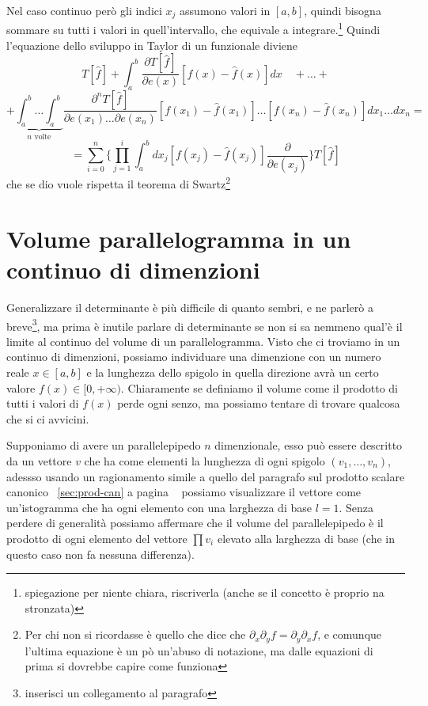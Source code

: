 \documentclass[11pt,a4paper]{report}
\theoremstyle{definition}
\theoremstyle{plain}
\theoremstyle{plain}
\begin{document}
			Nel caso continuo però gli indici $x_j$ assumono valori in $[a,b]$, quindi bisogna sommare su tutti i valori in quell'intervallo, che equivale a integrare.\footnote{spiegazione per niente chiara, riscriverla (anche se il concetto è proprio na stronzata)}\newline
			Quindi l'equazione dello sviluppo in Taylor di un funzionale diviene
			\begin{equation}
				T[\hat f]+\int_a^b \frac{\partial T[\hat f]}{\partial e(x)}[f(x)-\hat f(x)]dx\quad+\dots+
			\end{equation}
			\[
				+\underbrace{\int_a^b\dots\int_a^b}_{n\textrm{ volte}}
				\frac{\partial^n T[\hat f]}{\partial e(x_1)\dots\partial e(x_n)}[f(x_1)-\hat f(x_1)]\dots[f(x_n)-\hat f(x_n)]dx_1\dots dx_n=
			\]
			\begin{equation}
				=\sum_{i=0}^n \Bigg\{\prod_{j=1}^i \int_a^b dx_j[f(x_j)-\hat f(x_j)]\frac{\partial}{\partial e(x_j)}\Bigg\}T[\hat f]
			\end{equation}
			che se dio vuole rispetta il teorema di Swartz\footnote{Per chi non si ricordasse è quello che dice che $\partial_x\partial_y f=\partial_y\partial_x f$, e comunque l'ultima equazione è un pò un'abuso di notazione, ma dalle equazioni di prima si dovrebbe capire come funziona}




		\section{Volume parallelogramma in un continuo di dimenzioni}
			Generalizzare il determinante è più difficile di quanto sembri, e ne parlerò a breve\footnote{inserisci un collegamento al paragrafo}, ma prima è inutile parlare di determinante se non si sa nemmeno qual'è il limite al continuo del volume di un parallelogramma.\newline
			Visto che ci troviamo in un continuo di dimenzioni, possiamo individuare una dimenzione con un numero reale $x\in[a,b]$ e la lunghezza dello spigolo in quella direzione avrà un certo valore $f(x)\in[0,+\infty)$.\newline
			Chiaramente se definiamo il volume come il prodotto di tutti i valori di $f(x)$ perde ogni senzo, ma possiamo tentare di trovare qualcosa che si ci avvicini.\newline

			Supponiamo di avere un parallelepipedo $n$ dimenzionale, esso può essere descritto da un vettore $v$ che ha come elementi la lunghezza di ogni spigolo $(v_1,\dots,v_n)$, adessso usando un ragionamento simile a quello del paragrafo sul prodotto scalare canonico ~\ref{sec:prod-can} a pagina ~\pageref{sec:prod-can} possiamo visualizzare il vettore come un'istogramma che ha ogni elemento con una larghezza di base $l=1$.\newline
			Senza perdere di generalità possiamo affermare che il volume del parallelepipedo è il prodotto di ogni elemento del vettore $\prod v_i$ elevato alla larghezza di base (che in questo caso non fa nessuna differenza).\newline
\end{document}
